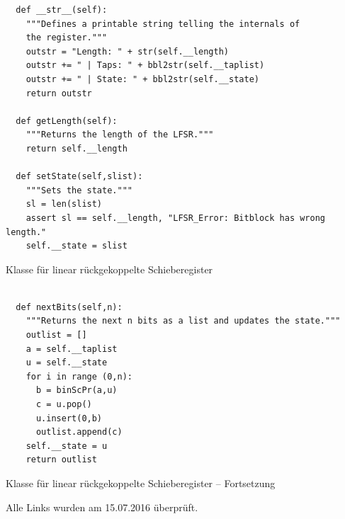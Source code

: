 \begin{refsegment}
\begin{sagecode}
\begin{verbatim}
  def __str__(self):
    """Defines a printable string telling the internals of
    the register."""
    outstr = "Length: " + str(self.__length)
    outstr += " | Taps: " + bbl2str(self.__taplist)
    outstr += " | State: " + bbl2str(self.__state)
    return outstr

  def getLength(self):
    """Returns the length of the LFSR."""
    return self.__length

  def setState(self,slist):
    """Sets the state."""
    sl = len(slist)
    assert sl == self.__length, "LFSR_Error: Bitblock has wrong length."
    self.__state = slist
\end{verbatim}
\caption{Klasse für linear rückgekoppelte
   Schieberegister
   }\label{Sage-code-bool-lfsr3}
\end{sagecode}

\begin{sagecode}
\begin{verbatim}

  def nextBits(self,n):
    """Returns the next n bits as a list and updates the state."""
    outlist = []
    a = self.__taplist
    u = self.__state
    for i in range (0,n):
      b = binScPr(a,u)
      c = u.pop()
      u.insert(0,b)
      outlist.append(c)
    self.__state = u
    return outlist
\end{verbatim}
\caption{Klasse für linear rückgekoppelte
   Schieberegister
   -- Fortsetzung}\label{Sage-code-bool-lfsr4}
\end{sagecode}



\printbibliography[%
	heading=subbibintoc,
	title={Literatur zu Kapitel \thechapter},
	segment=\therefsegment,
]

Alle Links wurden am 15.07.2016 überprüft.

\end{refsegment}

